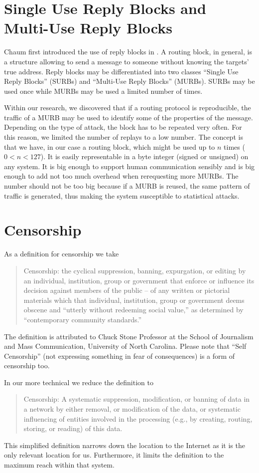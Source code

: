 \section{Single Use Reply Blocks and Multi-Use Reply Blocks}
Chaum first introduced the use of reply blocks in \cite{CHAUM1}. A routing block, in general, is a structure allowing to send a message to someone without knowing the targets' true address. Reply blocks may be differentiated into two classes ``Single Use Reply Blocks'' (SURBs)  and ``Multi-Use Reply Blocks'' (MURBs). SURBs may be used once while MURBs may be used a limited number of times. 

Within our research, we discovered that if a routing protocol is reproducible, the traffic of a MURB may be used to identify some of the properties of the message. Depending on the type of attack, the block has to be repeated very often. For this reason, we limited the number of replays to a low number. The concept is that we have, in our case a routing block, which might be used up to $n$ times ($0<n<127$). It is easily representable in a byte integer (signed or unsigned) on any system. It is big enough to support human communication sensibly and is big enough to add not too much overhead when rerequesting more MURBs. The number should not be too big because if a MURB is reused, the same pattern of traffic is generated, thus making the system susceptible to statistical attacks.

\section{Censorship}
As a definition for censorship we take
\begin{quote}
	Censorship: the cyclical suppression, banning, expurgation, or editing by an individual, institution, group or government that enforce or influence its decision against members of the public -- of any written or pictorial materials which that individual, institution, group or government deems obscene and ``utterly without redeeming social value,'' as determined by ``contemporary community standards.''
\end{quote}

The definition is attributed to Chuck Stone Professor at the School of Journalism and Mass Communication, University of North Carolina. Please note that ``Self Censorship'' (not expressing something in fear of consequences) is a form of censorship too.

In our more technical we reduce the definition to
\begin{quote}
	Censorship: A systematic suppression, modification, or banning of data in a network by either removal, or modification of the data, or systematic influencing of entities involved in the processing (e.g., by creating, routing, storing, or reading) of this data.
\end{quote}
This simplified definition narrows down the location to the Internet as it is the only relevant location for us.  Furthermore, it limits the definition to the maximum reach within that system.

